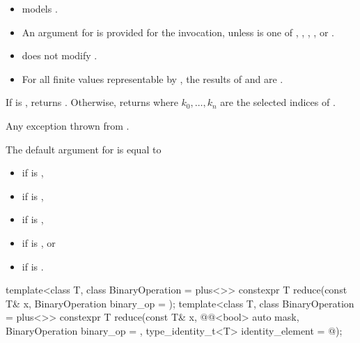 \begin{itemdescr}
\pnum
\constraints
\begin{itemize}
\item
   models
  .
\item
  An argument for  is provided for the invocation,
  unless  is one of ,
  , , , or
  .
\end{itemize}

\pnum
\expects
\begin{itemize}
 \item
    does not modify .
 \item
   For all finite values  representable by , the results of
    and  are .
\end{itemize}

\pnum
\returns
If  is , returns .
Otherwise, returns  where $k_0, \ldots, k_n$ are
the selected indices of .

\pnum
\throws
Any exception thrown from .

\pnum
\remarks
The default argument for  is equal to
\begin{itemize}
\item {} if  is ,
\item {} if  is ,
\item {} if  is ,
\item {} if  is , or
\item {} if  is .
\end{itemize}
\end{itemdescr}

\begin{itemdecl}
template<class T, class BinaryOperation = plus<>>
  constexpr T reduce(const T& x, BinaryOperation binary_op = {});
template<class T, class BinaryOperation = plus<>>
  constexpr T reduce(const T& x, @@<bool> auto mask, BinaryOperation binary_op = {},
                     type_identity_t<T> identity_element = @\seebelow@);
\end{itemdecl}

